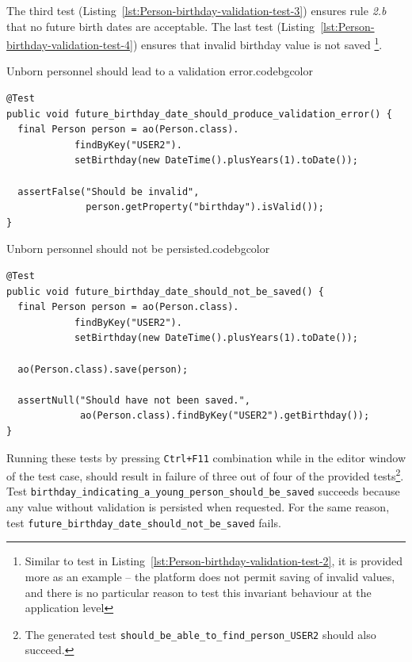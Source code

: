   The third test (Listing~\ref{lst:Person-birthday-validation-test-3}) ensures rule \emph{2.b} that no future birth dates are acceptable.
  The last test (Listing~\ref{lst:Person-birthday-validation-test-4}) ensures that invalid birthday value is not saved
  \footnote{Similar to test in Listing~\ref{lst:Person-birthday-validation-test-2}, it is provided more as an example -- the platform does not permit saving of invalid values, and there is no particular reason to test this invariant behaviour at the application level}.

\begin{code}{Unborn personnel should lead to a validation error.}{\label{lst:Person-birthday-validation-test-3}}{codebgcolor}
    \begin{lstlisting}
@Test
public void future_birthday_date_should_produce_validation_error() {	
  final Person person = ao(Person.class).
			findByKey("USER2").
			setBirthday(new DateTime().plusYears(1).toDate());	

  assertFalse("Should be invalid", 
              person.getProperty("birthday").isValid());
}
    \end{lstlisting}
  \end{code}

\begin{code}{Unborn personnel should not be persisted.}{\label{lst:Person-birthday-validation-test-4}}{codebgcolor}
    \begin{lstlisting}
@Test
public void future_birthday_date_should_not_be_saved() {	
  final Person person = ao(Person.class).
			findByKey("USER2").
			setBirthday(new DateTime().plusYears(1).toDate());	

  ao(Person.class).save(person);

  assertNull("Should have not been saved.", 
             ao(Person.class).findByKey("USER2").getBirthday());
}
    \end{lstlisting}
  \end{code}

  Running these tests by pressing \texttt{Ctrl+F11} combination while in the editor window of the test case, should result in failure of three out of four of the provided tests\footnote{The generated test \texttt{should\_be\_able\_to\_find\_person\_USER2} should also succeed.}.
  Test \texttt{birthday\_indicating\_a\_young\_person\_should\_be\_saved} succeeds because any value without validation is persisted when requested.
  For the same reason, test \texttt{future\_birthday\_date\_should\_not\_be\_saved} fails.


